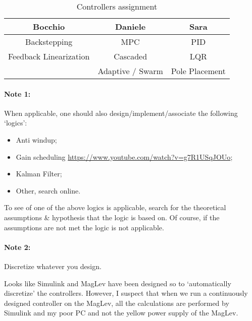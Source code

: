 \begin{table}[H]

    \centering

    \begin{tabular}{|c|c|c|}
        \hline
        \textbf{Bocchio}       & \textbf{Daniele} & \textbf{Sara}  \\
        \hline
        Backstepping           & MPC              & PID            \\
        Feedback Linearization & Cascaded         & LQR            \\
        ~                      & Adaptive / Swarm & Pole Placement \\
        \hline
    \end{tabular}

    \caption{Controllers assignment}
    \label{tab:controllers_assignment}

\end{table}

\paragraph{Note 1:}

When applicable, one should also design/implement/associate the following `logics':

\begin{itemize}
    \item Anti windup;
    \item Gain scheduling \url{https://www.youtube.com/watch?v=g7R1USqJOUo};
    \item Kalman Filter;
    \item Other, search online.
\end{itemize}

To see of one of the above logics is applicable, search for the theoretical assumptions \& hypothesis that the logic is based on. Of course, if the assumptions are not met the logic is not applicable.

\paragraph{Note 2:}

Discretize whatever you design.

Looks like Simulink and MagLev have been designed so to `automatically discretize' the controllers.
However, I suspect that when we run a continuously designed controller on the MagLev, all the calculations are performed by Simulink and my poor PC and not the yellow power supply of the MagLev.

